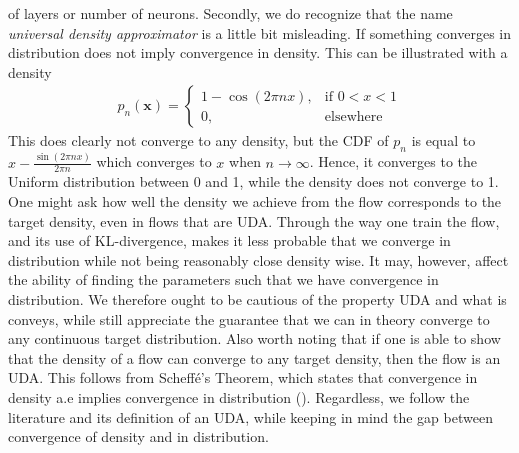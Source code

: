 of layers or number of neurons. 
Secondly, we do recognize that the name \emph{universal density approximator} is a little bit misleading. If something converges in 
distribution does not imply convergence in density. This can be illustrated with a density
\begin{align*}
    p_{n}(\bm x) = 
    \begin{cases}
        1 - \cos(2\pi n x), & \text{if \(0 < x < 1\)} \\
        0,& \text{elsewhere} 
    \end{cases}
\end{align*}
This does clearly not converge to any density, but the CDF of \(p_n\) is equal to 
\(x - \frac{\sin(2\pi n x)}{2 \pi n}\) which converges to \(x\) when \(n \rightarrow \infty\). Hence,
it converges to the Uniform distribution between 0 and 1, while the density does not converge to 1. 
One might ask how well the density we achieve from the flow corresponds to the target
density, even in flows that are UDA. Through the way one train the flow, and its 
use of KL-divergence, makes it less probable that we converge in distribution while 
not being reasonably close density wise. It may, however, affect the ability of finding the parameters
such that we have convergence in distribution. We therefore ought to be cautious of the property UDA and 
what is conveys, while still appreciate the guarantee that we can in theory converge to any continuous target distribution.
Also worth noting that if one is able to show that the density of a flow can converge to any target density, then
the flow is an UDA. This follows from Scheffé's Theorem, which states that convergence in density a.e implies convergence 
in distribution (\cite{scheffe}). Regardless, we follow the literature and its definition of an UDA, while keeping in mind
the gap between convergence of density and in distribution.
